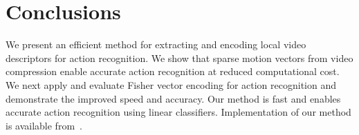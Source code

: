 \documentclass[10pt,twocolumn,letterpaper]{article}
\begin{document}
\section{Conclusions}
We present an efficient method for extracting and encoding local video descriptors for action recognition. We show that sparse motion vectors from video compression enable accurate action recognition at reduced computational cost. We next apply and evaluate Fisher vector encoding for action recognition and demonstrate the improved speed and accuracy.
Our method is fast and enables accurate action recognition using linear classifiers. Implementation of our method is available from~\cite{projectpage}.


{
\small


}
\end{document}

